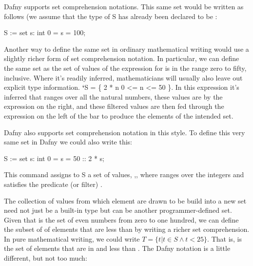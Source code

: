 \documentclass[letterpaper,10pt,english]{sphinxmanual}
\begin{document}
Dafny supports set comprehension notations. This same set would be
written as follows (we assume that the type of S has already been
declared to be :

\begin{sphinxVerbatim}[commandchars=\\\{\}]
S := set s: int \textbar{} 0 \PYGZlt{}= s \PYGZlt{}= 100;
\end{sphinxVerbatim}

Another way to define the same set in ordinary mathematical writing
would use a slightly richer form of set comprehension notation. In
particular, we can define the same set as the set of values of the
expression  for  is in the range zero to fifty, inclusive.
Where it’s readily inferred, mathematicians will usually also leave
out explicit type information. {\color{red}\bfseries{}{}`}S = \{ 2 * n \textbar{} 0 \textless{}= n \textless{}= 50 \}. In
this expression it’s inferred that  ranges over all the natural
numbers, these values are  by the expression on the right,
and these filtered values are then fed through the expression on the
left of the bar to produce the elements of the intended set.

Dafny also supports set comprehension notation in this style. To
define this very same set in Dafny we could also write this:

\begin{sphinxVerbatim}[commandchars=\\\{\}]
S := set s: int \textbar{} 0 \PYGZlt{}= s \PYGZlt{}= 50 :: 2 * s;
\end{sphinxVerbatim}

This command assigns to S a set of values, ,, where 
ranges over the integers and satisfies the predicate (or filter)
.

The collection of values from which element are drawn to be
build into a new set need not just be a built-in type but can
be another programmer-defined set. Given that  is the set
of even numbers from zero to one hundred, we can define the
subset of  of elements that are less than  by writing
a richer set comprehension. In pure mathematical writing, we
could write \(T = \{ t | t \in S \land t < 25\}.\) That is,
 is the set of elements that are in  and less than .
The Dafny notation is a little different, but not too much:
\end{document}

